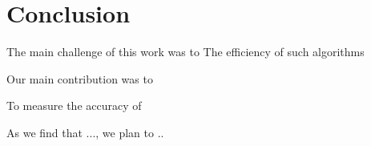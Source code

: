 \section{Conclusion} \label{sec:Conclusion}

The main challenge of this work was to
The efficiency of such algorithms

Our main contribution was to

To measure the accuracy of

As we find that ..., we plan to  ..




